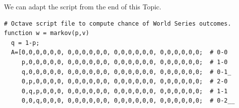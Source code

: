\begin{exercises}
\begin{answer}
\begin{center}
     \end{center}
     \begin{exparts}
      \partsitem We can adapt the script from the end of this Topic.
\begin{lstlisting}
# Octave script file to compute chance of World Series outcomes.
function w = markov(p,v)
  q = 1-p;
  A=[0,0,0,0,0,0, 0,0,0,0,0,0, 0,0,0,0,0,0, 0,0,0,0,0,0;  # 0-0
     p,0,0,0,0,0, 0,0,0,0,0,0, 0,0,0,0,0,0, 0,0,0,0,0,0;  # 1-0
     q,0,0,0,0,0, 0,0,0,0,0,0, 0,0,0,0,0,0, 0,0,0,0,0,0;  # 0-1_
     0,p,0,0,0,0, 0,0,0,0,0,0, 0,0,0,0,0,0, 0,0,0,0,0,0;  # 2-0
     0,q,p,0,0,0, 0,0,0,0,0,0, 0,0,0,0,0,0, 0,0,0,0,0,0;  # 1-1
     0,0,q,0,0,0, 0,0,0,0,0,0, 0,0,0,0,0,0, 0,0,0,0,0,0;  # 0-2__

\end{lstlisting}
\end{exparts}
\end{answer}
\end{exercises}
